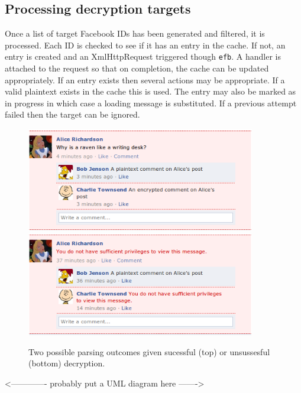\subsection{Processing decryption targets}

Once a list of target Facebook IDs has been generated and filtered, it is processed. Each ID is checked to see if it has an entry in the cache. If not, an entry is created and an XmlHttpRequest triggered though {\tt efb}. A handler is attached to the request so that on completion, the cache can be updated appropriately. If an entry exists then several actions may be appropriate. If a valid plaintext exists in the cache this is used. The entry may also be marked as in progress in which case a loading message is substituted. If a previous attempt failed then the target can be ignored.

    \begin{figure}[tbph]
        \begin{center}
        
                \includegraphics[width=10cm]{screens/content2.png}
                \includegraphics[width=10cm]{screens/content3.png}

            \caption{Two possible parsing outcomes given sucessful (top) or unsussesful (bottom) decryption.}
            \label{scn:ctrl}
        \end{center}
    \end{figure}
    

<------------- probably put a UML diagram here ------->



